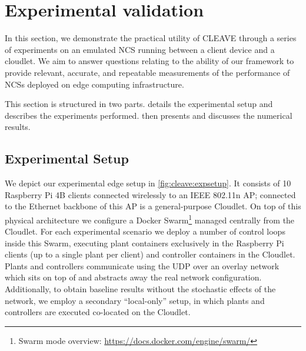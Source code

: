 \section{Experimental validation}\label{sec:experiments}



In this section, we demonstrate the practical utility of \ac{CLEAVE} through a series of experiments on an emulated \ac{NCS} running between a client device and a cloudlet.
We aim to answer questions relating to the ability of our framework to provide relevant, accurate, and repeatable measurements of the performance of \acp{NCS} deployed on edge computing infrastructure.

This section is structured in two parts.
 details the experimental setup and describes the experiments performed.
 then presents and discusses the numerical results.

\subsection{Experimental Setup}\label{ssec:expsetup}

We depict our experimental edge setup in \cref{fig:cleave:expsetup}.
It consists of \num{10} Raspberry Pi 4B  clients connected wirelessly to an IEEE 802.11n \ac{AP}; connected to the Ethernet backbone of this \ac{AP} is a general-purpose Cloudlet.
On top of this physical architecture we configure a Docker Swarm\footnote{Swarm mode overview: \url{https://docs.docker.com/engine/swarm/}} managed centrally from the Cloudlet.
For each experimental scenario we deploy a number of control loops inside this Swarm, executing plant containers exclusively in the Raspberry Pi clients (up to a single plant per client) and controller containers in the Cloudlet.
Plants and controllers communicate using the \ac{UDP} over an overlay network which sits on top of and abstracts away the real network configuration.
Additionally, to obtain baseline results without the stochastic effects of the network, we employ a secondary ``local-only'' setup, in which plants and controllers are executed co-located on the Cloudlet.

